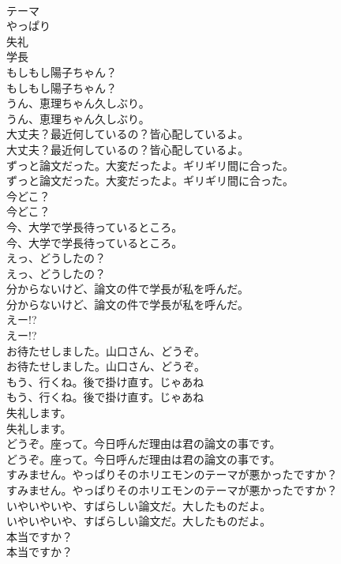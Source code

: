 \documentclass[8pt]{extreport}
\begin{document}
\begin{CJK}{UTF8}{min}
\\	テーマ
\\	やっぱり
\\	失礼
\\	学長
\\	もしもし陽子ちゃん？	
\\	もしもし陽子ちゃん？ 
\\	うん、恵理ちゃん久しぶり。	
\\	うん、恵理ちゃん久しぶり。 
\\	大丈夫？最近何しているの？皆心配しているよ。	
\\	大丈夫？最近何しているの？皆心配しているよ。 
\\	ずっと論文だった。大変だったよ。ギリギリ間に合った。	
\\	ずっと論文だった。大変だったよ。ギリギリ間に合った。 
\\	今どこ？	
\\	今どこ？ 
\\	今、大学で学長待っているところ。	
\\	今、大学で学長待っているところ。 
\\	えっ、どうしたの？	
\\	えっ、どうしたの？ 
\\	分からないけど、論文の件で学長が私を呼んだ。	
\\	分からないけど、論文の件で学長が私を呼んだ。 
\\	えー!?	
\\	えー!? 
\\	お待たせしました。山口さん、どうぞ。	
\\	お待たせしました。山口さん、どうぞ。 
\\	もう、行くね。後で掛け直す。じゃあね	
\\	もう、行くね。後で掛け直す。じゃあね 
\\	失礼します。	
\\	失礼します。 
\\	どうぞ。座って。今日呼んだ理由は君の論文の事です。	
\\	どうぞ。座って。今日呼んだ理由は君の論文の事です。 
\\	すみません。やっぱりそのホリエモンのテーマが悪かったですか？	
\\	すみません。やっぱりそのホリエモンのテーマが悪かったですか？ 
\\	いやいやいや、すばらしい論文だ。大したものだよ。	
\\	いやいやいや、すばらしい論文だ。大したものだよ。 
\\	本当ですか？	
\\	本当ですか？ 

\end{CJK}
\end{document}
